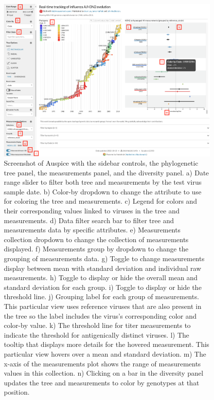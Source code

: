 \documentclass[utf8]{FrontiersinHarvard} %
\begin{document}
\begin{figure}[h!]
  \begin{center}
    \includegraphics[width=\textwidth]{figures/figure-2-screen-shot}
  \end{center}
  \caption{
    Screenshot of Auspice with the sidebar controls, the phylogenetic tree panel, the measurements panel, and the diversity panel.
a) Date range slider to filter both tree and measurements by the test virus sample date.
b) Color-by dropdown to change the attribute to use for coloring the tree and measurements.
c) Legend for colors and their corresponding values linked to viruses in the tree and measurements.
d) Data filter search bar to filter tree and measurements data by specific attributes.
e) Measurements collection dropdown to change the collection of measurements displayed.
f) Measurements group by dropdown to change the grouping of measurements data.
g) Toggle to change measurements display between mean with standard deviation and individual raw measurements.
h) Toggle to display or hide the overall mean and standard deviation for each group.
i) Toggle to display or hide the threshold line.
j) Grouping label for each group of measurements.
This particular view uses reference viruses that are also present in the tree so the label includes the virus's corresponding color and color-by value.
k) The threshold line for titer measurements to indicate the threshold for antigenically distinct viruses.
l) The tooltip that displays more details for the hovered measurement.
This particular view hovers over a mean and standard deviation.
m) The x-axis of the measurements plot shows the range of measurements values in this collection.
n) Clicking on a bar in the diversity panel updates the tree and measurements to color by genotypes at that position.
  }\label{fig:2}
\end{figure}
\end{document}
